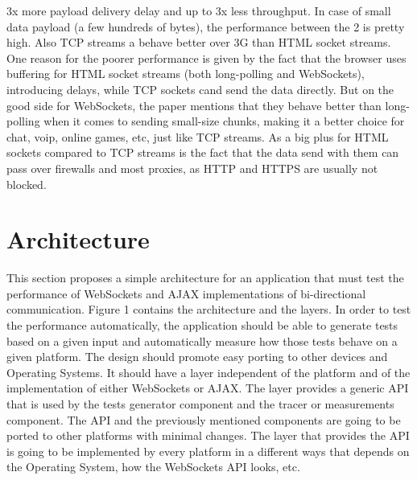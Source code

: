 \documentclass[conference]{IEEEtran}
\begin{document}
3x more payload delivery delay and up to 3x less throughput. In case of small
data payload (a few hundreds of bytes), the performance between the 2 is
pretty high. Also TCP streams a behave better over 3G than HTML socket streams.
One reason for the poorer performance is given by the fact that the browser uses
buffering for HTML socket streams (both long-polling and WebSockets), introducing
delays, while TCP sockets cand send the data directly. But on the good side for
WebSockets, the paper mentions that they behave better than long-polling when
it comes to sending small-size chunks, making it a better choice for chat,
voip, online games, etc, just like TCP streams. As a big plus for HTML sockets
compared to TCP streams is the fact that the data send with them can pass over
firewalls and most proxies, as HTTP and HTTPS are usually not blocked.

\section{Architecture}
This section proposes a simple architecture for an application that must test
the performance of WebSockets and AJAX implementations of bi-directional
communication. Figure 1 contains the architecture and the layers. In order to
test the performance automatically, the application should be able to generate
tests based on a given input and automatically measure how those tests behave
on a given platform. The design should promote easy porting to other devices
and Operating Systems. It should have a layer independent of the platform and
of the implementation of either WebSockets or AJAX. The layer provides a generic
API that is used by the tests generator component and the tracer or measurements
component. The API and the previously mentioned components are going to be ported
to other platforms with minimal changes. The layer that provides the API is going
to be implemented by every platform in a different ways that depends on the
Operating System, how the WebSockets API looks, etc.

{}

\end{document}
